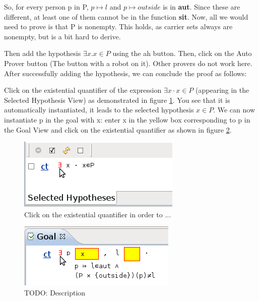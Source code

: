 So, for every person \textsf{p} in \textsf{P}, $p \mapsto l$ and $p \mapsto outside$ is in \textbf{aut}. Since these are different, at least one of them cannot be in the function \textbf{sit}. Now, all we would need to prove is that \textsf{P} is nonempty. This holds, as carrier sets always are nonempty, but is a bit hard to derive. 



Then add the hypothesis $\exists x . x \in P$ using the \textsf{ah} button. Then, click on the Auto Prover button (The button with a robot on it). Other provers do not work here. After successfully adding the hypothesis, we can conclude the proof as follows:

Click on the existential quantifier of the expression $\exists x \cdot x \in P$ (appearing in the \textsf{Selected Hypothesis View}) as demonstrated in figure \ref{fig_tut_10_instantiate_x}. You see that it is automatically instantiated, it leads to the selected hypothesis $x \in P$. We can now instantiate \textsf{p} in the goal with \textsf{x}: enter \textsf{x} in the yellow box corresponding to \textsf{p} in the \textsf{Goal View} and click on the existential quantifier as shown in figure \ref{fig_tut_10_instantiate_p}. 

\begin{figure}[!h]
\begin{center}
	\includegraphics{img/tutorial/tut_10_instantiate_x.png}
	\caption{Click on the existential quantifier in order to ...}
	\label{fig_tut_10_instantiate_x}
\end{center}
\end{figure}

\begin{figure}[!h]
\begin{center}
	\includegraphics{img/tutorial/tut_10_instantiate_p.png}
	\caption{TODO: Description}
	\label{fig_tut_10_instantiate_p}
\end{center}
\end{figure}

